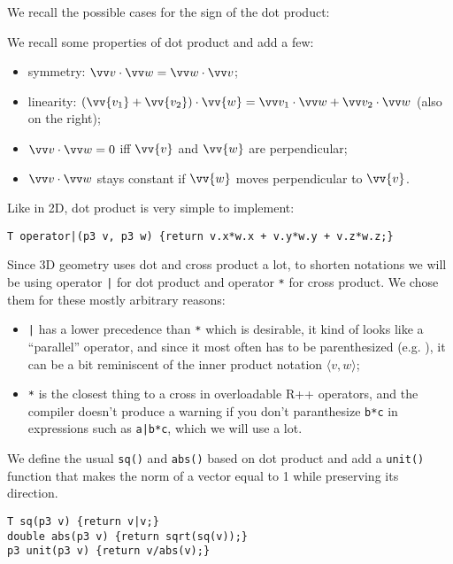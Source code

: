 We recall the possible cases for the sign of the dot product:

We recall some properties of dot product and add a few:
\begin{itemize}
\item symmetry: $\dotv{v}{w} = \dotv{w}{v}$;
\item linearity: $(\vv{v_1}+\vv{v_2})\cdot\vv{w} = \dotv{v_1}{w} + \dotv{v_2}{w}$ (also on the right);
\item $\dotv{v}{w} = 0$ iff $\vv{v}$ and $\vv{w}$ are perpendicular;
\item $\dotv{v}{w}$ stays constant if $\vv{w}$ moves perpendicular to $\vv{v}$.
\end{itemize}

Like in 2D, dot product is very simple to implement:
\begin{lstlisting}
T operator|(p3 v, p3 w) {return v.x*w.x + v.y*w.y + v.z*w.z;}
\end{lstlisting}

Since 3D geometry uses dot and cross product a lot, to shorten notations we will be using operator \lstinline{|} for dot product and operator \lstinline{*} for cross product. We chose them for these mostly arbitrary reasons:
\begin{itemize}
\item \lstinline{|} has a lower precedence than \lstinline|*| which is desirable, it kind of looks like a ``parallel'' operator, and since it most often has to be parenthesized (e.g. ), it can be a bit reminiscent of the inner product notation $\langle v,w \rangle$;
\item \lstinline|*| is the closest thing to a cross in overloadable R++ operators, and the compiler doesn't produce a warning if you don't paranthesize \lstinline|b*c| in expressions such as \lstinline{a|b*c}, which we will use a lot.
\end{itemize}

We define the usual \lstinline{sq()} and \lstinline{abs()} based on dot product and add a \lstinline|unit()| function that makes the norm of a vector equal to 1 while preserving its direction.
\begin{lstlisting}
T sq(p3 v) {return v|v;}
double abs(p3 v) {return sqrt(sq(v));}
p3 unit(p3 v) {return v/abs(v);}
\end{lstlisting}


